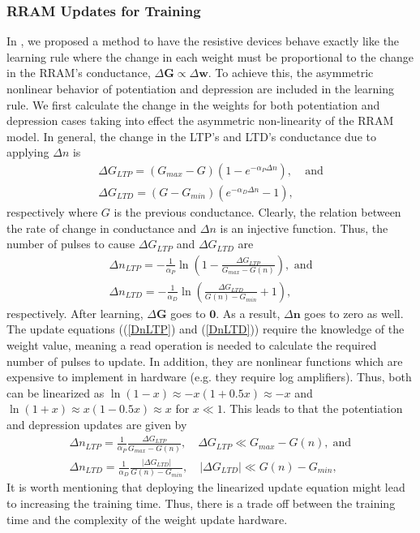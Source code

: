 \documentclass[english]{article}
\renewcommand{\cite}{\citep}
\begin{document}
\subsubsection{RRAM Updates for Training}\label{sec:rram_updates}
In \cite{fouda2018independent}, we proposed a method to have the resistive devices behave exactly like the learning rule where the change in each weight must be proportional to the change in the RRAM's conductance, $\Delta \mathbf{G} \propto \Delta \mathbf{w}$. 
To achieve this, the asymmetric nonlinear behavior of potentiation and depression are included in the learning rule. 
We first calculate the change in the weights for both potentiation and depression cases taking into effect the asymmetric non-linearity of the RRAM model.
In general, the change in the LTP's and LTD's conductance due to applying $\Delta n$ is
\begin{equation}
\begin{split}
\Delta G_{LTP}=\left(G_{max}-\!G\right)\left(1-e^{-\alpha_P \Delta n}\right),\;&\text{and}\\
\Delta G_{LTD}=(G-G_{min})(e^{-\alpha_D \Delta n}-1),&
\end{split}
\end{equation}
respectively where $G$ is the previous conductance. Clearly, the relation between the rate of change in conductance and $\Delta n$ is an injective function. Thus, the number of pulses to cause $\Delta G_{LTP}$ and  $\Delta G_{LTD}$ are 
\begin{eqnarray}
\Delta n_{LTP}=-\frac{1}{\alpha_P}\ln{\left(1-\frac{\Delta G_{LTP}}{G_{max}-G(n)}\right)},\,\, \text{and} \label{DnLTP}\\
\Delta n_{LTD}=-\frac{1}{\alpha_D}\ln{\left(\frac{\Delta G_{LTD}}{G(n)-G_{min}}+1\right)}, 
\label{DnLTD}
\end{eqnarray}
\noindent respectively. 
After learning, $\Delta \mathbf{G}$ goes to $\mathbf{0}$.
As a result, $\Delta \mathbf{n}$ goes to zero as well. The update equations ((\ref{DnLTP}) and (\ref{DnLTD})) require the knowledge of the weight value, meaning a read operation is needed to calculate the required number of pulses to update. In addition, they are nonlinear functions which are expensive to implement in hardware (e.g. they require log amplifiers). 
Thus, both can be linearized as $\ln(1-x)\approx -x(1+0.5x)\approx -x$ and $\ln(1+x)\approx x(1-0.5x)\approx x$ for $x\ll 1$. 
This leads to that the potentiation and depression updates are given by 
%
\begin{eqnarray}
\Delta n_{LTP}=\frac{1}{\alpha_P}\frac{\Delta G_{LTP}}{G_{max}-G(n)},\quad \Delta G_{LTP}\ll G_{max}-G(n), \; \text{and} \label{DnLTP}\\
\Delta n_{LTD}=\frac{1}{\alpha_D}\frac{|\Delta G_{LTD}|}{G(n)-G_{min}}, \quad  |\Delta G_{LTD}|\ll G(n)-G_{min}, \quad \;
\label{DnLTD2}
\end{eqnarray}
%
It is worth mentioning that deploying the linearized update equation might lead to increasing the training time. Thus, there is a trade off between the training time and the complexity of the weight update hardware. 
%
\end{document}
